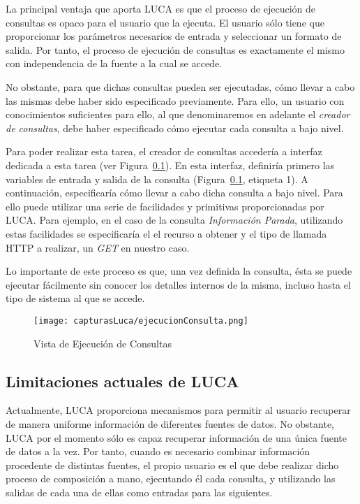 La principal ventaja que aporta LUCA es que el proceso de ejecución de consultas es opaco para el usuario que la ejecuta. El usuario sólo tiene que proporcionar los parámetros necesarios de entrada y seleccionar un formato de salida. Por tanto, el proceso de ejecución de consultas es exactamente el mismo con independencia de la fuente a la cual se accede.

No obstante, para que dichas consultas pueden ser ejecutadas, cómo llevar a cabo las mismas debe haber sido especificado previamente. Para ello, un usuario con conocimientos suficientes para ello, al que denominaremos en adelante el \emph{creador de consultas}, debe haber especificado cómo ejecutar cada consulta a bajo nivel.

Para poder realizar esta tarea, el creador de consultas accedería a interfaz dedicada a esta tarea (ver Figura~\ref{}). En esta interfaz, definiría primero las variables de entrada y salida de la consulta (Figura~\ref{}, etiqueta 1). A continuación, especificaría cómo llevar a cabo dicha consulta a bajo nivel. Para ello puede utilizar una serie de facilidades y primitivas proporcionadas por LUCA. Para ejemplo, en el caso de la consulta \emph{Información Parada}, utilizando estas facilidades se especificaría el el recurso a obtener y el tipo de llamada HTTP a realizar, un \emph{GET} en nuestro caso.

Lo importante de este proceso es que, una vez definida la consulta, ésta se puede ejecutar fácilmente sin conocer los detalles internos de la misma, incluso hasta el tipo de sistema al que se accede.


	\begin{figure}[H]
		\centering
		\texttt{[image: capturasLuca/ejecucionConsulta.png]}
		\caption{Vista de Ejecución de Consultas}\label{fig:ejecucionConsultas}
	\end{figure}

\subsection{Limitaciones actuales de LUCA}

Actualmente, LUCA proporciona mecanismos para permitir al usuario recuperar de manera uniforme información de diferentes fuentes de datos. No obstante, LUCA por el momento sólo es capaz recuperar información de una única fuente de datos a la vez. Por tanto, cuando es necesario combinar información procedente de distintas fuentes, el propio usuario es el que debe realizar dicho proceso de composición a mano, ejecutando él cada consulta, y utilizando las salidas de cada una de ellas como entradas para las siguientes.

